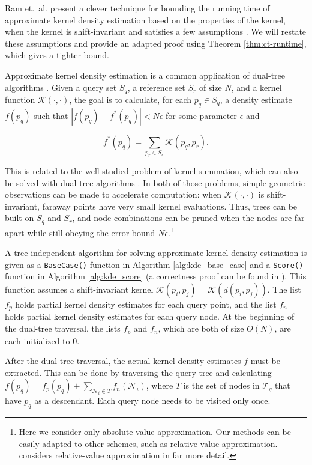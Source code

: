 Ram et.~al. present a clever technique for bounding the
running time of approximate kernel density estimation based on the properties of
the kernel, when the kernel is shift-invariant and satisfies a few assumptions
\cite{ram2009}.  We will restate these assumptions and provide an adapted proof
using Theorem \ref{thm:ct-runtime}, which gives a tighter bound.

Approximate kernel density estimation is a common application of dual-tree
algorithms \cite{gray2003nonparametric, nbody}.  Given a query set $S_q$, a
reference set $S_r$ of size $N$, and a kernel function $\mathcal{K}(\cdot,
\cdot)$, the goal is to calculate, for each $p_q \in S_q$, a density estimate
$f(p_q)$ such that $| f(p_q) - f^*(p_q) | < N \epsilon$ for some
parameter $\epsilon$ and

\begin{equation}
f^*(p_q) = \sum_{p_r \in S_r} \mathcal{K}(p_q, p_r).
\end{equation}

This is related to the well-studied problem of kernel summation, which can
also be solved with dual-tree algorithms \cite{lee2006faster, lee2008fast}.  In
both of those problems, simple geometric observations can be made to accelerate
computation: when $\mathcal{K}(\cdot, \cdot)$ is shift-invariant, faraway points
have very small kernel evaluations.  Thus, trees can be built on $S_q$ and
$S_r$, and node combinations can be pruned when the nodes are far apart while
still obeying the error bound $N \epsilon$.\footnote{Here we consider
only absolute-value approximation.  Our methods can be easily adapted to other
schemes, such as relative-value approximation.  \cite{ram2009} considers
relative-value approximation in far more detail.}

A tree-independent algorithm for solving approximate kernel density estimation
is given as a \texttt{BaseCase()} function in Algorithm \ref{alg:kde_base_case}
and a \texttt{Score()} function in Algorithm \ref{alg:kde_score} (a correctness
proof can be found in \cite{curtin2013tree}).  This function
assumes a shift-invariant kernel $\mathcal{K}(p_i, p_j) = \mathcal{K}(d( p_i,
p_j ))$.  The list $f_p$ holds partial kernel density estimates for
each query point, and the list $f_n$ holds partial kernel density
estimates for each query node.  At the beginning of the dual-tree traversal, the
lists $f_p$ and $f_n$, which are both of size $O(N)$, are each
initialized to 0.

After the dual-tree traversal, the actual kernel density estimates $f$
must be extracted.  This can be done by traversing the query tree and
calculating $f(p_q) = f_p(p_q) + \sum_{\mathscr{N}_i \in T}
f_n(\mathscr{N}_i)$, where $T$ is the set of nodes in $\mathscr{T}_q$ that
have $p_q$ as a descendant.  %
Each query node needs to be visited only once.

